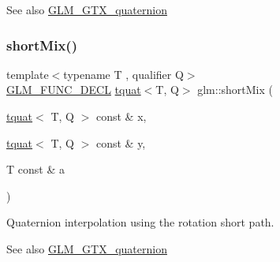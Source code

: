 \begin{DoxySeeAlso}{See also}
\mbox{\hyperlink{group__gtx__quaternion}{G\+L\+M\+\_\+\+G\+T\+X\+\_\+quaternion}} 
\end{DoxySeeAlso}
\mbox{\label{group__gtx__quaternion_gaf0ad63ac791b1f9a587e363837c2d538}} 
\subsubsection{\texorpdfstring{short\+Mix()}{shortMix()}}
{\footnotesize\ttfamily template$<$typename T , qualifier Q$>$ \\
\mbox{\hyperlink{setup_8hpp_ab2d052de21a70539923e9bcbf6e83a51}{G\+L\+M\+\_\+\+F\+U\+N\+C\+\_\+\+D\+E\+CL}} \mbox{\hyperlink{structglm_1_1tquat}{tquat}}$<$T, Q$>$ glm\+::short\+Mix (\begin{DoxyParamCaption}\item[{\mbox{\hyperlink{structglm_1_1tquat}{tquat}}$<$ T, Q $>$ const \&}]{x,  }\item[{\mbox{\hyperlink{structglm_1_1tquat}{tquat}}$<$ T, Q $>$ const \&}]{y,  }\item[{T const \&}]{a }\end{DoxyParamCaption})}

Quaternion interpolation using the rotation short path.

\begin{DoxySeeAlso}{See also}
\mbox{\hyperlink{group__gtx__quaternion}{G\+L\+M\+\_\+\+G\+T\+X\+\_\+quaternion}} 
\end{DoxySeeAlso}
\mbox{\label{group__gtx__quaternion_gacfcb16619e166e672c4672aff50a565c}} 
